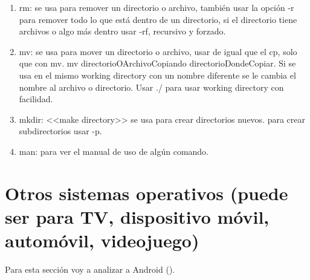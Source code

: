 \documentclass[stu, 12pt, letterpaper, donotrepeattitle, floatsintext, natbib, helv]{apa7}
\begin{document}
\begin{enumerate}
\begin{enumerate}
        \item rm: se usa para remover un directorio o archivo, también usar la opción -r para remover todo lo que está dentro de un directorio, si el directorio tiene archivos o algo más dentro usar -rf, recursivo y forzado.
        \item mv: se usa para mover un directorio o archivo, usar de igual que el cp, solo que con mv. mv directorioOArchivoCopiando directorioDondeCopiar. Si se usa en el mismo working directory con un nombre diferente se le cambia el nombre al archivo o directorio. Usar ./ para usar working directory con facilidad.
        \item mkdir: <<make directory>> se usa para crear directorios nuevos. para crear subdirectorios usar -p.
        \item man: para ver el manual de uso de algún comando.
    \end{enumerate}
    

\end{enumerate}

\section*{Otros sistemas operativos (puede ser para TV, dispositivo móvil, automóvil, videojuego)}
{}

Para esta sección voy a analizar a Android (\cite{android}).
\end{document}
